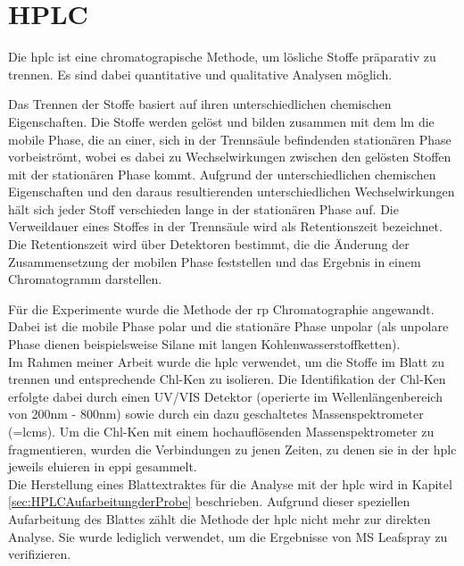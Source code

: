 \section{HPLC}

Die \gls{hplc} ist eine chromatograpische Methode, um lösliche Stoffe präparativ zu trennen. Es sind dabei quantitative und qualitative Analysen möglich. \cite[S. 165]{Chromatographie} 

Das Trennen der Stoffe basiert auf ihren unterschiedlichen chemischen Eigenschaften. Die Stoffe werden gelöst und bilden zusammen mit dem \gls{lm} die mobile Phase, die an einer, sich in der Trennsäule befindenden stationären Phase vorbeiströmt, wobei es dabei zu Wechselwirkungen zwischen den gelösten Stoffen mit der stationären Phase kommt. Aufgrund der unterschiedlichen chemischen Eigenschaften und den daraus resultierenden unterschiedlichen Wechselwirkungen hält sich jeder Stoff verschieden lange in der stationären Phase auf. Die Verweildauer eines Stoffes in der Trennsäule wird als Retentionszeit bezeichnet. \cite[S. 31-32]{Chromatographie} Die Retentionszeit wird über Detektoren bestimmt, die die Änderung der Zusammensetzung der mobilen Phase feststellen und das Ergebnis in einem Chromatogramm darstellen. \cite[S. 46]{Chromatographie} 

Für die Experimente wurde die Methode der \gls{rp} Chromatographie angewandt. Dabei ist die mobile Phase polar und die stationäre Phase unpolar (als unpolare Phase dienen beispielsweise Silane mit langen Kohlenwasserstoffketten). \cite[S. 189]{Chromatographie}\\

Im Rahmen meiner Arbeit wurde die \gls{hplc} verwendet, um die Stoffe im Blatt zu trennen und entsprechende \gls{Chl-K}en zu isolieren. Die Identifikation der \gls{Chl-K}en erfolgte dabei durch einen UV/VIS Detektor (operierte im Wellenlängenbereich von 200nm - 800nm) sowie durch ein dazu geschaltetes Massenspektrometer (=\gls{lcms}). Um die \gls{Chl-K}en mit einem hochauflösenden Massenspektrometer zu fragmentieren, wurden die Verbindungen zu jenen Zeiten, zu denen sie in der \gls{hplc} jeweils eluieren in \gls{eppi} gesammelt.\\

Die Herstellung eines Blattextraktes für die Analyse mit der \gls{hplc} wird in Kapitel \ref{sec:HPLCAufarbeitungderProbe} beschrieben. Aufgrund dieser speziellen Aufarbeitung des Blattes zählt die Methode der \gls{hplc} nicht mehr zur direkten Analyse. Sie wurde lediglich verwendet, um die Ergebnisse von MS Leafspray zu verifizieren.
